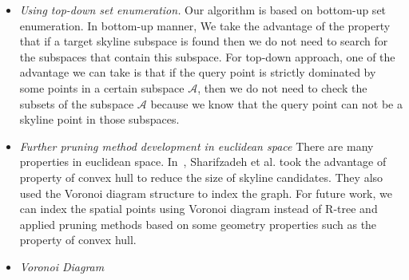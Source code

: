 \begin{itemize}
   
\item \textit{Using top-down set enumeration.} Our algorithm is based on bottom-up set enumeration. In bottom-up manner, We take the advantage of the property that if a target skyline subspace is found then we do not need to search for the subspaces that contain this subspace. For top-down approach, one of the advantage we can take is that if the query point is strictly dominated by some points in a certain subspace $\mathcal{A}$, then we do not need to check the subsets of the subspace $\mathcal{A}$ because we know that the query point can not be a skyline point in those subspaces.

\item \textit{Further pruning method development in euclidean space} There are many properties in euclidean space. In~\cite{sharifzadeh2006spatial}, Sharifzadeh et al. took the advantage of property of convex hull to reduce the size of skyline candidates. They also used the Voronoi diagram structure to index the graph. For future work, we can index the spatial points using Voronoi diagram instead of R-tree and applied pruning methods based on some geometry properties such as the property of convex hull.

\item \textit{Voronoi Diagram}     


\end{itemize}














